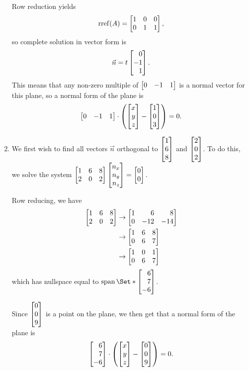 \begin{exercises}
\begin{problist}
\begin{solution}
\begin{enumerate}
\[					\]
					Row reduction yields
					\[
						\Rref(A) = \mat{1&0&0\\0&1&1},
					\]
					so complete solution in vector form is 
					\[
						\vec n = t\mat{0\\-1\\1}.
					\]
					This means that any non-zero multiple of $\mat{0&-1&1}$ is a normal vector for this plane, so a normal form of the plane is 
					\[
						\mat{0&-1&1} \cdot \left(\mat{x\\y\\z} - \mat{1\\0\\3}\right)=0.
					\]
				\item  We first wish to find all vectors $\vec n$ orthogonal to $\mat{1\\6\\8}$ and $\mat{2\\0\\2}$. 
					To do this, we solve the system 
					$\mat{1&6&8\\2&0&2}\mat{n_x\\n_y\\n_z}=\mat{0\\0}.$

					Row reducing, we have 
					\begin{align*}
						\mat{1&6&8\\2&0&2}&\rightarrow \mat{1&6&8\\0&-12&-14}\\
						&\rightarrow \mat{1&6&8\\0&6&7}\\
						&\rightarrow \mat{1&0&1\\0&6&7}\\
					\end{align*}
					which has nullspace equal to $\Span\Set*{\mat{6\\7\\-6}}$.

					Since $\mat{0\\0\\9}$ is a point on the plane, we then get that a normal form of the plane is \[\mat{6\\7\\-6}\cdot \left(\mat{x\\y\\z}-\mat{0\\0\\9}\right)=0.\]


\end{enumerate}
\end{solution}
\end{problist}
\end{exercises}
